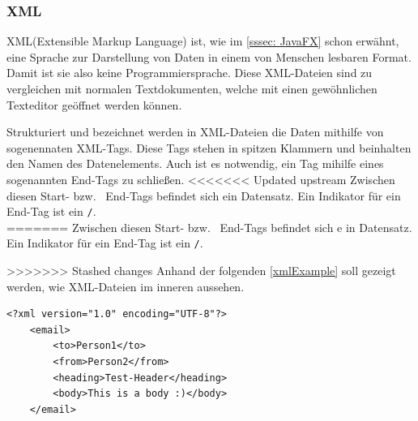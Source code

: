 \subsubsection{XML}
XML(Extensible Markup Language) ist, wie im \autoref{sssec: JavaFX} schon erwähnt, eine Sprache zur Darstellung von Daten in einem von Menschen lesbaren Format.
Damit ist sie also keine Programmiersprache.
Diese XML-Dateien sind zu vergleichen mit normalen Textdokumenten, welche mit einen gewöhnlichen Texteditor geöffnet werden können.

Strukturiert und bezeichnet werden in XML-Dateien die Daten mithilfe von sogenennaten XML-Tags.
Diese Tags stehen in spitzen Klammern und beinhalten den Namen des Datenelements.
Auch ist es notwendig, ein Tag mihilfe eines sogenannten End-Tags zu schließen.
<<<<<<< Updated upstream
Zwischen diesen Start- bzw. \ End-Tags befindet sich ein Datensatz.
Ein Indikator für ein End-Tag ist ein \lstinline{/}.\\
=======
Zwischen diesen Start- bzw. \ End-Tags befindet sich e
in Datensatz.
Ein Indikator für ein End-Tag ist ein \lstinline{/}.

>>>>>>> Stashed changes
Anhand der folgenden \autoref{xmlExample} soll gezeigt werden, wie XML-Dateien im inneren aussehen.
\begin{lstlisting}[caption=XML-Codebeispiel,label=xmlExample]
<?xml version="1.0" encoding="UTF-8"?>
    <email>
        <to>Person1</to>
        <from>Person2</from>
        <heading>Test-Header</heading>
        <body>This is a body :)</body>
    </email>
\end{lstlisting}

